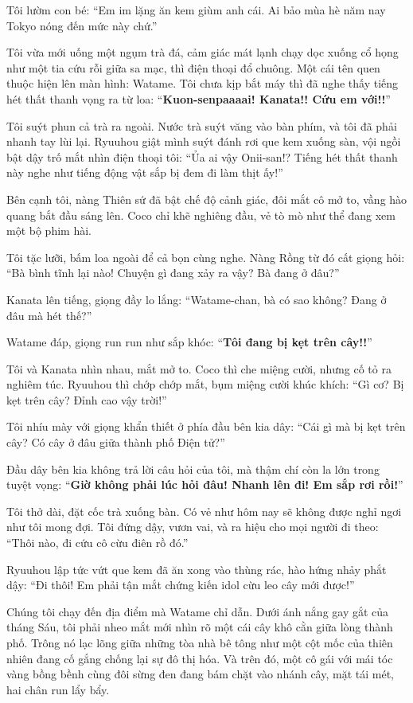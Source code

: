 \documentclass[../main.tex]{subfiles}
\begin{document}
Tôi lườm con bé: ``Em im lặng ăn kem giùm anh cái. Ai bảo mùa hè năm nay Tokyo nóng đến mức này chứ.''

Tôi vừa mới uống một ngụm trà đá, cảm giác mát lạnh chạy dọc xuống cổ họng như một tia cứu rỗi giữa sa mạc, thì điện thoại đổ chuông. Một cái tên quen thuộc hiện lên màn hình: Watame. Tôi chưa kịp bắt máy thì đã nghe thấy tiếng hét thất thanh vọng ra từ loa: ``\textbf{Kuon-senpaaaai! Kanata!! Cứu em với!!}''

Tôi suýt phun cả trà ra ngoài. Nước trà suýt văng vào bàn phím, và tôi đã phải nhanh tay lùi lại. Ryuuhou giật mình suýt đánh rơi que kem xuống sàn, vội ngồi bật dậy trố mắt nhìn điện thoại tôi: ``Ủa ai vậy Onii-san!? Tiếng hét thất thanh này nghe như tiếng động vật sắp bị đem đi làm thịt ấy!''

Bên cạnh tôi, nàng Thiên sứ đã bật chế độ cảnh giác, đôi mắt cô mở to, vầng hào quang bắt đầu sáng lên. Coco chỉ khẽ nghiêng đầu, vẻ tò mò như thể đang xem một bộ phim hài.

Tôi tặc lưỡi, bấm loa ngoài để cả bọn cùng nghe. Nàng Rồng từ đó cất giọng hỏi: ``Bà bình tĩnh lại nào! Chuyện gì đang xảy ra vậy? Bà đang ở đâu?''

Kanata lên tiếng, giọng đầy lo lắng: ``Watame-chan, bà có sao không? Đang ở đâu mà hét thế?''

Watame đáp, giọng run run như sắp khóc: ``\textbf{Tôi đang bị kẹt trên cây!!}''

Tôi và Kanata nhìn nhau, mắt mở to. Coco thì che miệng cười, nhưng cố tỏ ra nghiêm túc. Ryuuhou thì chớp chớp mắt, bụm miệng cười khúc khích: ``Gì cơ? Bị kẹt trên cây? Đỉnh cao vậy trời!''

Tôi nhíu mày với giọng khẩn thiết ở phía đầu bên kia dây: ``Cái gì mà bị kẹt trên cây? Có cây ở đâu giữa thành phố Điện tử?''

Đầu dây bên kia không trả lời câu hỏi của tôi, mà thậm chí còn la lớn trong tuyệt vọng: ``\textbf{Giờ không phải lúc hỏi đâu! Nhanh lên đi! Em sắp rơi rồi!}''

Tôi thở dài, đặt cốc trà xuống bàn. Có vẻ như hôm nay sẽ không được nghỉ ngơi như tôi mong đợi. Tôi đứng dậy, vươn vai, và ra hiệu cho mọi người đi theo: ``Thôi nào, đi cứu cô cừu điên rồ đó.''

Ryuuhou lập tức vứt que kem đã ăn xong vào thùng rác, hào hứng nhảy phắt dậy: ``Đi thôi! Em phải tận mắt chứng kiến idol cừu leo cây mới được!''

\ct

Chúng tôi chạy đến địa điểm mà Watame chỉ dẫn. Dưới ánh nắng gay gắt của tháng Sáu, tôi phải nheo mắt mới nhìn rõ một cái cây khô cằn giữa lòng thành phố. Trông nó lạc lõng giữa những tòa nhà bê tông như một cột mốc của thiên nhiên đang cố gắng chống lại sự đô thị hóa. Và trên đó, một cô gái với mái tóc vàng bồng bềnh cùng đôi sừng đen đang bám chặt vào nhánh cây, mặt tái mét, hai chân run lẩy bẩy.
\end{document}
